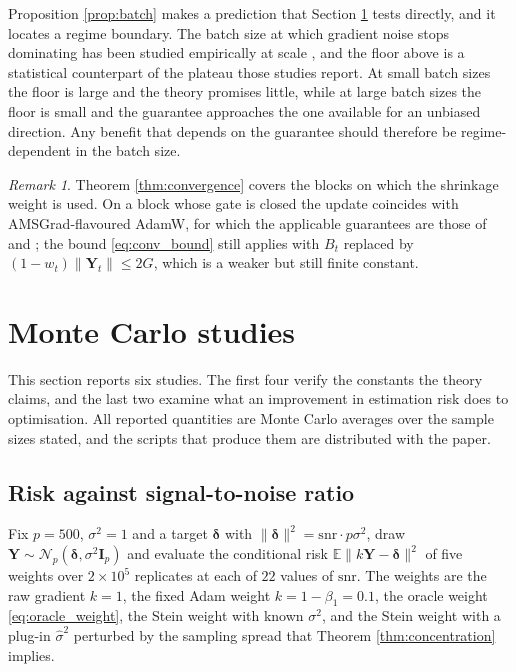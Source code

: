 \documentclass[a4paper,fleqn]{cas-sc}
\theoremstyle{plain}
\theoremstyle{definition}
\theoremstyle{remark}
\newtheorem{remark}{Remark}
\newcommand{\E}{\mathbb{E}}
\begin{document}
Proposition \ref{prop:batch} makes a prediction that Section \ref{sec:simulation} tests directly, and it locates a regime boundary. The batch size at which gradient noise stops dominating has been studied empirically at scale \citep{keskar2017, smith2018, shallue2019}, and the floor above is a statistical counterpart of the plateau those studies report. At small batch sizes the floor is large and the theory promises little, while at large batch sizes the floor is small and the guarantee approaches the one available for an unbiased direction. Any benefit that depends on the guarantee should therefore be regime-dependent in the batch size.

\begin{remark}
Theorem \ref{thm:convergence} covers the blocks on which the shrinkage weight is used. On a block whose gate is closed the update coincides with AMSGrad-flavoured AdamW, for which the applicable guarantees are those of \citet{reddi2018} and \citet{chen2019}; the bound \eqref{eq:conv_bound} still applies with $B_t$ replaced by $(1-w_t)\|\bm Y_t\|\le 2G$, which is a weaker but still finite constant.
\end{remark}

\section{Monte Carlo studies}
\label{sec:simulation}

This section reports six studies. The first four verify the constants the theory claims, and the last two examine what an improvement in estimation risk does to optimisation. All reported quantities are Monte Carlo averages over the sample sizes stated, and the scripts that produce them are distributed with the paper.

\subsection{Risk against signal-to-noise ratio}
\label{sec:sim_snr}

Fix $p=500$, $\sigma^2=1$ and a target $\bm\delta$ with $\|\bm\delta\|^2=\mathrm{snr}\cdot p\sigma^2$, draw $\bm Y\sim\mathcal N_p(\bm\delta,\sigma^2\bm I_p)$ and evaluate the conditional risk $\E\|k\bm Y-\bm\delta\|^2$ of five weights over $2\times10^{5}$ replicates at each of $22$ values of $\mathrm{snr}$. The weights are the raw gradient $k=1$, the fixed Adam weight $k=1-\beta_1=0.1$, the oracle weight \eqref{eq:oracle_weight}, the Stein weight with known $\sigma^2$, and the Stein weight with a plug-in $\hat\sigma^2$ perturbed by the sampling spread that Theorem \ref{thm:concentration} implies.
\end{document}
